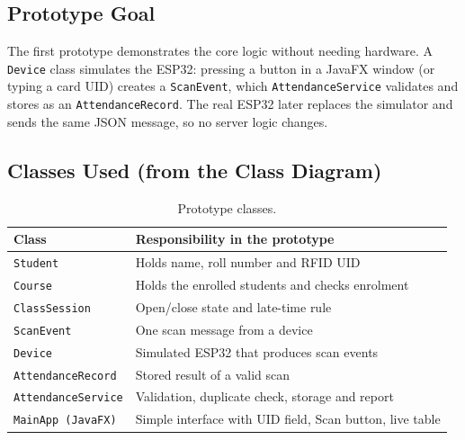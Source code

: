 \documentclass[11pt,a4paper]{article}
\begin{document}
\subsection{Prototype Goal}
The first prototype demonstrates the core logic without needing hardware. A \texttt{Device} class simulates the ESP32: pressing a button in a JavaFX window (or typing a card UID) creates a \texttt{ScanEvent}, which \texttt{AttendanceService} validates and stores as an \texttt{AttendanceRecord}. The real ESP32 later replaces the simulator and sends the same JSON message, so no server logic changes.
 
\subsection{Classes Used (from the Class Diagram)}
\begin{table}[H]
\centering
\small
\begin{tabular}{lp{9.5cm}}
\toprule
\textbf{Class} & \textbf{Responsibility in the prototype}\\
\midrule
\texttt{Student} & Holds name, roll number and RFID UID\\
\texttt{Course} & Holds the enrolled students and checks enrolment\\
\texttt{ClassSession} & Open/close state and late-time rule\\
\texttt{ScanEvent} & One scan message from a device\\
\texttt{Device} & Simulated ESP32 that produces scan events\\
\texttt{AttendanceRecord} & Stored result of a valid scan\\
\texttt{AttendanceService} & Validation, duplicate check, storage and report\\
\texttt{MainApp (JavaFX)} & Simple interface with UID field, Scan button, live table\\
\bottomrule
\end{tabular}
\caption{Prototype classes.}
\end{table}
 
\end{document}
